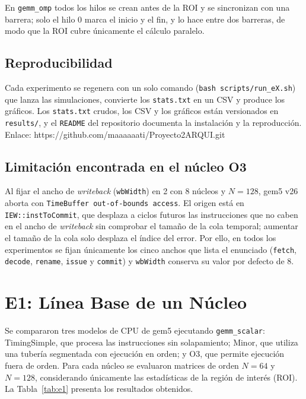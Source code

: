 \documentclass[journal]{IEEEtran}
\begin{document}
En \texttt{gemm\_omp} todos los hilos se crean antes de la ROI y se
sincronizan con una barrera; solo el hilo 0 marca el inicio y el fin, y
lo hace entre dos barreras, de modo que la ROI cubre únicamente el
cálculo paralelo.

\subsection{Reproducibilidad}

Cada experimento se regenera con un solo comando
(\texttt{bash scripts/run\_eX.sh}) que lanza las simulaciones, convierte
los \texttt{stats.txt} en un CSV y produce los gráficos. Los
\texttt{stats.txt} crudos, los CSV y los gráficos están versionados en
\texttt{results/}, y el \texttt{README} del repositorio documenta la
instalación y la reproducción. 
Enlace: https://github.com/maaaaaati/Proyecto2ARQUI.git

\subsection{Limitación encontrada en el núcleo O3}

Al fijar el ancho de \emph{writeback} (\texttt{wbWidth}) en 2 con 8
núcleos y $N=128$, gem5 v26 aborta con
\texttt{TimeBuffer out-of-bounds access}. El origen está en
\texttt{IEW::instToCommit}, que desplaza a ciclos futuros las
instrucciones que no caben en el ancho de \emph{writeback} sin comprobar
el tamaño de la cola temporal; aumentar el tamaño de la cola solo
desplaza el índice del error. Por ello, en todos los experimentos se
fijan únicamente los cinco anchos que lista el enunciado
(\texttt{fetch}, \texttt{decode}, \texttt{rename}, \texttt{issue} y
\texttt{commit}) y \texttt{wbWidth} conserva su valor por defecto de 8.

\section{E1: Línea Base de un Núcleo}
\label{sec:e1}

Se compararon tres modelos de CPU de gem5 ejecutando
\texttt{gemm\_scalar}: TimingSimple, que procesa las instrucciones
sin solapamiento; Minor, que utiliza una tubería segmentada con
ejecución en orden; y O3, que permite ejecución fuera de orden.
Para cada núcleo se evaluaron matrices de orden $N=64$ y $N=128$,
considerando únicamente las estadísticas de la región de interés
(ROI). La Tabla~\ref{tab:e1} presenta los resultados obtenidos.
\end{document}
